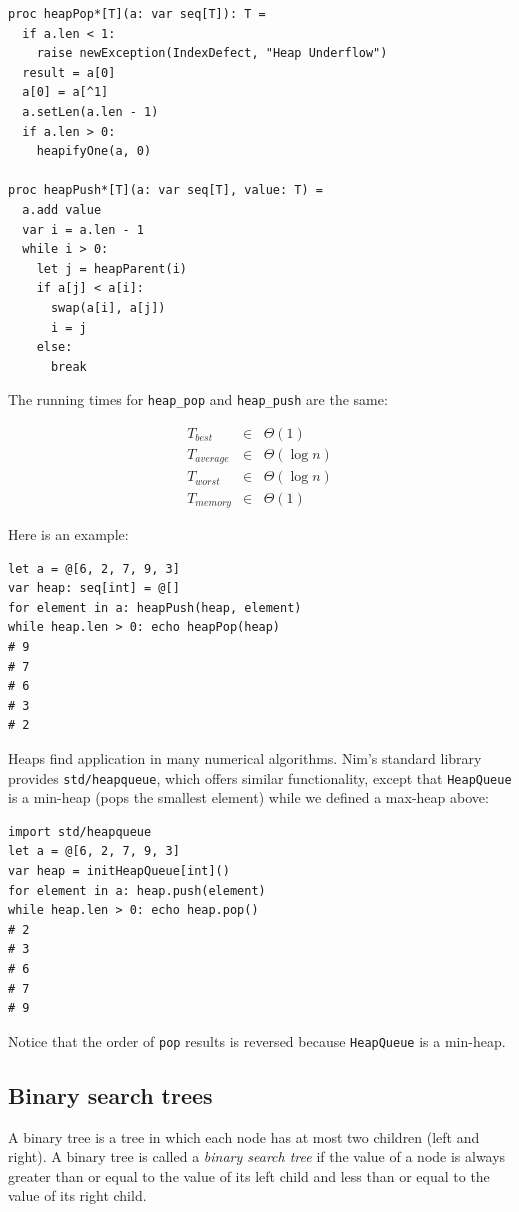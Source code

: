 \documentclass[justified, sixbynine]{tufte-book}
\def\ft{\small\tt}
\theoremstyle{plain}%
\newtheorem * {corollary}{Corollary}
\theoremstyle{definition}
\theoremstyle{remark}
\newtheorem * {remark}{Remark}
\newtheorem * {note}{Note}
\begin{document}
\begin{fullwidth}
\begin{lstlisting}
proc heapPop*[T](a: var seq[T]): T =
  if a.len < 1:
    raise newException(IndexDefect, "Heap Underflow")
  result = a[0]
  a[0] = a[^1]
  a.setLen(a.len - 1)
  if a.len > 0:
    heapifyOne(a, 0)

proc heapPush*[T](a: var seq[T], value: T) =
  a.add value
  var i = a.len - 1
  while i > 0:
    let j = heapParent(i)
    if a[j] < a[i]:
      swap(a[i], a[j])
      i = j
    else:
      break
\end{lstlisting}

The running times for {\ft heap\_pop} and {\ft heap\_push} are the same:

\begin{eqnarray}
T_{best} &\in &\Theta (1) \\
T_{average} &\in &\Theta (\log n) \\
T_{worst} &\in &\Theta (\log n) \\
T_{memory} &\in &\Theta (1)
\end{eqnarray}

Here is an example:

\begin{lstlisting}
let a = @[6, 2, 7, 9, 3]
var heap: seq[int] = @[]
for element in a: heapPush(heap, element)
while heap.len > 0: echo heapPop(heap)
# 9
# 7
# 6
# 3
# 2
\end{lstlisting}

Heaps find application in many numerical algorithms. Nim's standard library provides {\ft std/heapqueue}, which offers similar functionality, except that {\ft HeapQueue} is a min-heap (pops the smallest element) while we defined a max-heap above:

\begin{lstlisting}
import std/heapqueue
let a = @[6, 2, 7, 9, 3]
var heap = initHeapQueue[int]()
for element in a: heap.push(element)
while heap.len > 0: echo heap.pop()
# 2
# 3
# 6
# 7
# 9
\end{lstlisting}

Notice that the order of {\ft pop} results is reversed because {\ft HeapQueue} is a min-heap.

\subsection{Binary search trees}


A binary tree is a tree in which each node has at most two children (left and right). A binary tree is called a {\it binary search tree} if the value of a node is always greater than or equal to the value of its left child and less than or equal to the value of its right child.


\end{fullwidth}
\end{document}
